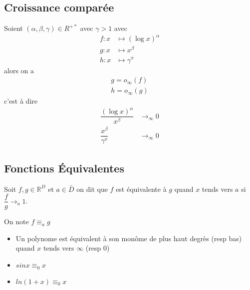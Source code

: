 \documentclass[11pt,colorlinks]{book}
\theoremstyle{mytheoremstyle}
\theoremstyle{mytheoremstyle}
\theoremstyle{mytheoremstyle}
\theoremstyle{mytheoremstyle}
\theoremstyle{mytheoremstyle}
\theoremstyle{mytheoremstyle}
\theoremstyle{mytheoremstyle}
\theoremstyle{mytheoremstyle}
\theoremstyle{myproblemstyle}
\def\mbb#1{\mathbb{#1}}
\def\bR{\mbb{R}}
\begin{document}
    \subsection{Croissance comparée}
    \begin{theorem}
      Soient $(\alpha,\beta,\gamma) \in R^{+*}$ avec $\gamma > 1$ avec 
      \begin{align*}
        f : x &\mapsto (\log x)^{\alpha} \\ 
        g : x &\mapsto x^{\beta} \\ 
        h : x &\mapsto \gamma^{x}
      \end{align*} 
      alors on a 
      \begin{align*}
        g = o_{\infty}(f) \\ 
        h = o_{\infty}(g)
      \end{align*}
      c'est à dire 
      \begin{align*}
        \dfrac{(\log x)^\alpha}{x^\beta} &\to_{\infty} 0 \\ 
        \dfrac{x^{\beta}}{\gamma^x} &\to_{\infty} 0
      \end{align*}
    \end{theorem}

    \subsection{Fonctions Équivalentes}
    \begin{definition}
      Soit $f,g \in \bR^{D}$ et $a \in \bar{D}$ on dit que $f$ est équivalente à $g$ 
      quand $x$ tends vers $a$ si $\dfrac{f}{g} \to_{a} 1$.  

      On note $f \equiv_a g$ 
    \end{definition}
    \begin{ex}
      \begin{itemize}
        \item Un polynome est équivalent à son monôme de plus haut degrès (resp bas) quand $x$ tends vers $\infty$ (resp $0$)
        \item $sin x \equiv_{0} x$
        \item $ln(1+x) \equiv_{0} x$
      \end{itemize}
    \end{ex}
\end{document}
